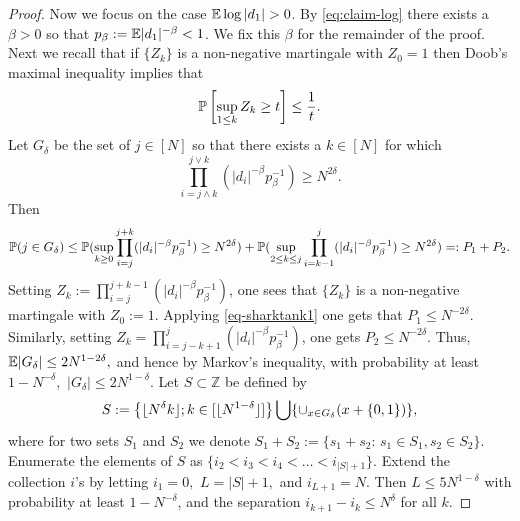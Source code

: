 \documentclass{amsart}
\numberwithin{equation}{section}
\def\corAB{}
\def\corABrev{\textcolor{black}}
\begin{document}
\begin{proof}
 \corAB{Now we focus on the case $\mathbb E \log |d_1| >0$. By \eqref{eq:claim-log} there exists a $\beta > 0$ so that $p_\beta:=\mathbb{E} |d_1|^{-\beta} < 1$. We fix this $\beta$ for the remainder of the proof. Next} we recall that if $\{Z_k\}$ is a non-negative
  martingale with $Z_0=1$ then
  Doob's maximal inequality implies that
 \begin{equation}
   \label{eq-sharktank1}
  \P\left[ \sup_{1 \leq k } Z_k \geq t\right] \leq \frac{1}{t}.
\end{equation}
Let $G_\delta$ be the set of $j \in [N]$ so that there exists a \corAB{$k \in [N]$ for which}
  \[
    \corAB{  \prod_{i=j\wedge k}^{j \vee k} ( |d_i|^{-\beta}p_\beta^{-1}) \geq N^{2\delta}.}
  \]
  Then
  $$\P(j\in G_\delta)\leq
  \P(\sup_{k\geq 0} \prod_{i=j}^{j+k} ( |d_i|^{-\beta}p_\beta^{-1}) \geq N^{2\delta})+
  \P(\sup_{\corAB{2}\leq k\leq j} \prod_{i=k-1}^j ( |d_i|^{-\beta}p_\beta^{-1}) \geq N^{2\delta})=:P_1+P_2.$$
  Setting $Z_k:= \prod_{i=j}^{j+k-1} ( |d_i|^{-\beta}p_\beta^{-1})$,
  one sees that $\{Z_k\}$ is a non-negative martingale with $Z_0:=1$.
  Applying \eqref{eq-sharktank1} one gets that $P_1\leq N^{-2\delta}$.
  Similarly, setting
  $Z_k= \prod_{i=j-k+1}^{j} ( |d_i|^{-\beta}p_\beta^{-1})$,
  one gets $P_2\leq N^{-2\delta}$.
 Thus,
  $\mathbb{E} |G_{\delta}| \leq 2N^{1-2\delta},$
  and \corAB{hence by Markov's inequality}, with probability at least $1-N^{-\delta},$
  $|G_{\delta}| \leq 2N^{1-\delta}.$
  Let $S \subset \mathbb{Z}$ be defined by
  \begin{equation}\label{eq:dfn-S}
    S := \corABrev{\left\{\lfloor N^\delta k\rfloor; k \in [\lfloor N^{1-\delta}\rfloor ] \right\}} \bigcup \{\cup_{x \in G_{\delta}}(x+ \{0,1\})\},
  \end{equation}
  \corAB{where for two sets $S_1$ and $S_2$ we denote $S_1+S_2:=\{s_1+s_2:\, s_1 \in S_1, s_2 \in S_2\}$}. Enumerate the elements of $S$ as $\{ i_2 < i_3 < i_4 < \dots < i_{|S|+1} \}.$  Extend \corAB{the collection $i$'s} by letting $i_1 =0,$ $L = |S|+1,$ and $i_{L+1}=N.$  Then $L \leq 5N^{1-\delta}$ with probability
  at least $1-N^{-\delta}$,
  and the separation $i_{k+1} - i_k \leq  N^{\delta}$ for all $k.$


\end{proof}
\end{document}

